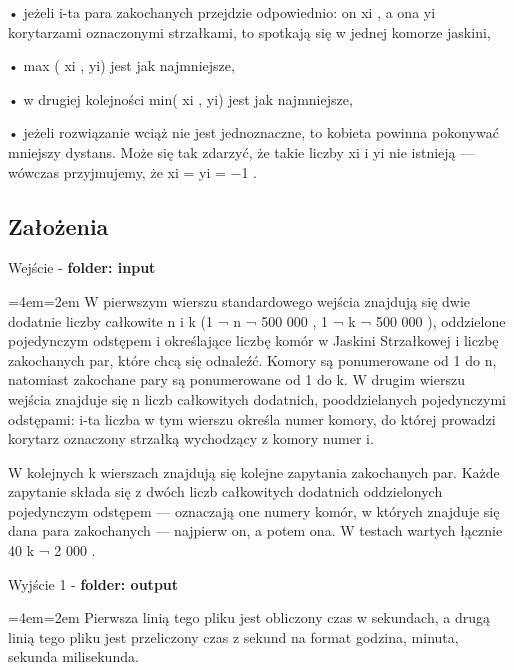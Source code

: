 \documentclass[12pt,a4paper]{article}
\newenvironment{blockquote}{%
  \par%
  \medskip
  \leftskip=4em\rightskip=2em%
  \noindent\ignorespaces}{%
  \par\medskip}
\begin{document}
• jeżeli i-ta para zakochanych przejdzie odpowiednio: on xi
, a ona yi korytarzami oznaczonymi strzałkami, to spotkają się w jednej komorze jaskini,




• max ( xi
, yi) jest jak najmniejsze,


• w drugiej kolejności min( xi
, yi) jest jak najmniejsze,

• jeżeli rozwiązanie wciąż nie jest jednoznaczne, to kobieta powinna pokonywać mniejszy
dystans.
Może się tak zdarzyć, że takie liczby xi
i yi nie istnieją — wówczas przyjmujemy,
że xi = yi = −1 .

        
        
        \subsection{Założenia}
        
            Wejście - \textbf{folder: input}
            \begin{blockquote}
                W pierwszym wierszu standardowego wejścia znajdują się dwie dodatnie liczby całkowite n
i k (1 ¬ n ¬ 500 000 , 1 ¬ k ¬ 500 000 ), oddzielone pojedynczym odstępem i określające
liczbę komór w Jaskini Strzałkowej i liczbę zakochanych par, które chcą się odnaleźć. Komory
są ponumerowane od 1 do n, natomiast zakochane pary są ponumerowane od 1 do k.
W drugim wierszu wejścia znajduje się n liczb całkowitych dodatnich, pooddzielanych
pojedynczymi odstępami: i-ta liczba w tym wierszu określa numer komory, do której prowadzi
korytarz oznaczony strzałką wychodzący z komory numer i.

W kolejnych k wierszach znajdują się kolejne zapytania zakochanych par. Każde zapytanie składa się z dwóch liczb całkowitych dodatnich oddzielonych pojedynczym odstępem —
oznaczają one numery komór, w których znajduje się dana para zakochanych — najpierw on,
a potem ona.
W testach wartych łącznie 40%
k ¬ 2 000 .
            \end{blockquote}
            
            \noindent Wyjście 1 - \textbf{folder: output}
            
            \begin{blockquote}
                Pierwsza linią tego pliku jest obliczony czas w sekundach, a drugą linią tego pliku jest przeliczony czas z sekund na format godzina, minuta, sekunda milisekunda.
                \end{blockquote}
                
\end{document}
